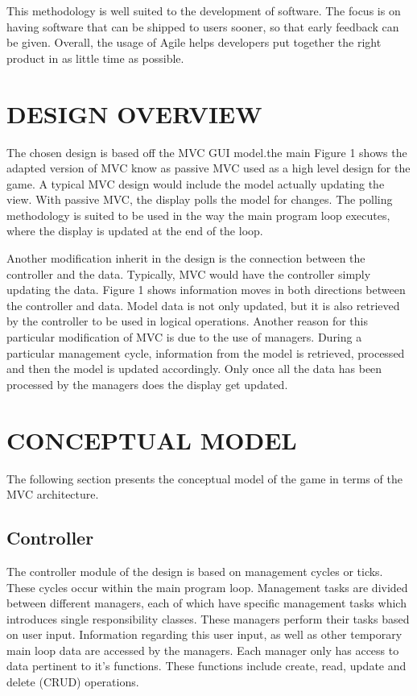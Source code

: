 \documentclass[10pt,twocolumn]{witseiepaper}
\begin{document}
This methodology is well suited to the development of software. The focus is on having software that can be shipped to users sooner, so that early feedback can be given. Overall, the usage of Agile helps developers put together the right product in as little time as possible.

%
\section{DESIGN OVERVIEW} %
The chosen design is based off the MVC GUI model.the main Figure 1 shows the adapted version of MVC know as passive MVC used as a high level design for the game. A typical MVC design would include the model actually updating the view. With passive MVC, the display polls the model for changes. The polling methodology is suited to be used in the way the main program loop executes, where the display is updated at the end of the loop. 

Another modification inherit in the design is the connection between the controller and the data. Typically, MVC would have the controller simply updating the data. Figure 1 shows information moves in both directions between the controller and data. Model data is not only updated, but it is also retrieved by the controller to be used in logical operations. Another reason for this particular modification of MVC is due to the use of managers. During a particular management cycle, information from the model is retrieved, processed and then the model is updated accordingly. Only once all the data has been processed by the managers does the display get updated.  




%
\section{CONCEPTUAL MODEL} %

The following section presents the conceptual model of the game in terms of the MVC architecture.

\subsection{Controller}
The controller module of the design is based on management cycles or ticks. These cycles occur within the main program loop. Management tasks are divided between different managers, each of which have specific management tasks which introduces single responsibility classes. These managers perform their tasks based on user input. Information regarding this user input, as well as other temporary main loop data are accessed by the managers. Each manager only has access to data pertinent to it's functions. These functions include create, read, update and delete (CRUD) operations.
\end{document}

